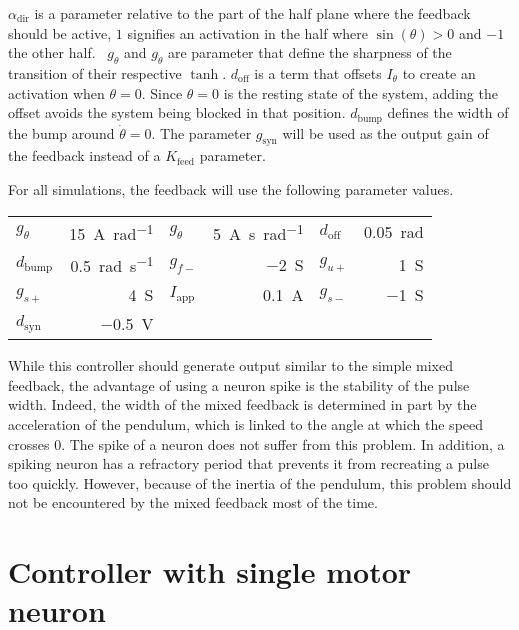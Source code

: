 $\alpha_\text{dir}$ is a parameter relative to the part of the half plane where the feedback should be active, $1$ signifies an activation in the half where $\sin\left(\theta\right)>0$ and $-1$ the other half. 
$g_\theta$ and $g_{\dot{\theta}}$ are parameter that define the sharpness of the transition of their respective $\tanh$.
$d_\text{off}$ is a term that offsets $I_\theta$ to create an activation when $\theta = 0$. Since $\theta = 0$ is the resting state of the system, adding the offset avoids the system being blocked in that position.
$d_\text{bump}$ defines the width of the bump around $\dot{\theta} = 0$.
The parameter $g_{\text{syn}}$ will be used as the output gain of the feedback instead of a $K_\text{feed}$ parameter. 

For all simulations, the feedback will use the following parameter values.
{

\large\centering
\begin{tabular}{lr|lr|lr}
    $g_\theta$      & \qty{15}{\ampere\per\radian}  & $g_{\dot{\theta}}$    & \qty{5}{\ampere\second\per\radian} & $d_\text{off}$  &    \qty{0.05}{\radian}\\
    $d_\text{bump}$       & \qty{0.5}{\radian\per\second} & $g_{f-}$    & \qty{-2}{\siemens}   & $g_{u+}$          & \qty{1}{\siemens}\\
    $g_{s+}$    & \qty{4}{\siemens}    & $I_\text{app}$    & \qty{0.1}{\ampere} & $g_{s-}$    & \qty{-1}{\siemens}\\
    $d_\text{syn}$    & \qty{-0.5}{\volt} & & & &
\end{tabular}

}

While this controller should generate output similar to the simple mixed feedback, the advantage of using a neuron spike is the stability of the pulse width.
Indeed, the width of the mixed feedback is determined in part by the acceleration of the pendulum, which is linked to the angle at which the speed crosses $0$.
The spike of a neuron does not suffer from this problem.
In addition, a spiking neuron has a refractory period that prevents it from recreating a pulse too quickly.
However, because of the inertia of the pendulum, this problem should not be encountered by the mixed feedback most of the time. 

\section{Controller with single motor neuron}

